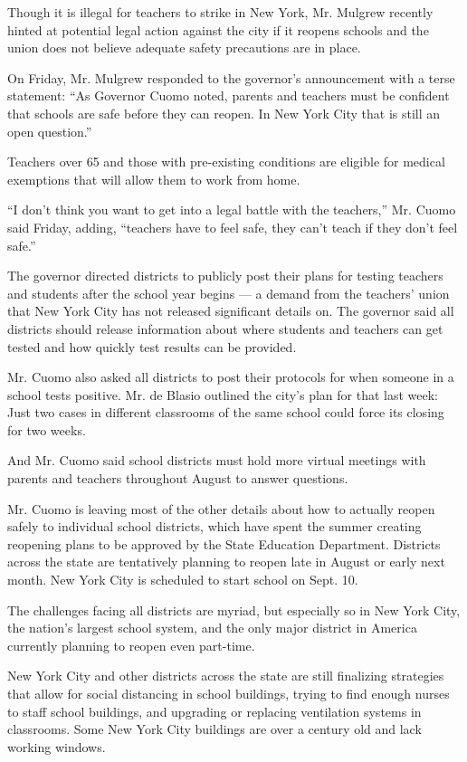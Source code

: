 Though it is illegal for teachers to strike in New York, Mr. Mulgrew
recently hinted at potential legal action against the city if it reopens
schools and the union does not believe adequate safety precautions are
in place.

On Friday, Mr. Mulgrew responded to the governor's announcement with a
terse statement: ``As Governor Cuomo noted, parents and teachers must be
confident that schools are safe before they can reopen. In New York City
that is still an open question.''

Teachers over 65 and those with pre-existing conditions are eligible for
medical exemptions that will allow them to work from home.

``I don't think you want to get into a legal battle with the teachers,''
Mr. Cuomo said Friday, adding, ``teachers have to feel safe, they can't
teach if they don't feel safe.''

The governor directed districts to publicly post their plans for testing
teachers and students after the school year begins --- a demand from the
teachers' union that New York City has not released significant details
on. The governor said all districts should release information about
where students and teachers can get tested and how quickly test results
can be provided.

Mr. Cuomo also asked all districts to post their protocols for when
someone in a school tests positive. Mr. de Blasio outlined the city's
plan for that last week: Just two cases in different classrooms of the
same school could force its closing for two weeks.

And Mr. Cuomo said school districts must hold more virtual meetings with
parents and teachers throughout August to answer questions.

Mr. Cuomo is leaving most of the other details about how to actually
reopen safely to individual school districts, which have spent the
summer creating reopening plans to be approved by the State Education
Department. Districts across the state are tentatively planning to
reopen late in August or early next month. New York City is scheduled to
start school on Sept. 10.

The challenges facing all districts are myriad, but especially so in New
York City, the nation's largest school system, and the only major
district in America currently planning to reopen even part-time.

New York City and other districts across the state are still finalizing
strategies that allow for social distancing in school buildings, trying
to find enough nurses to staff school buildings, and upgrading or
replacing ventilation systems in classrooms. Some New York City
buildings are over a century old and lack working windows.

